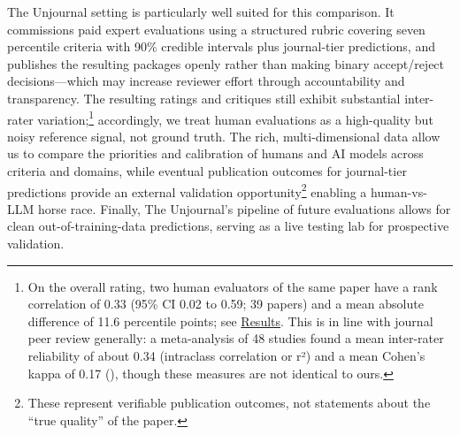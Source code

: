 \documentclass[
  11pt,
  letterpaper,
]{article}
\begin{document}
The Unjournal setting is particularly well suited for this comparison.
It commissions paid expert evaluations using a structured rubric
covering seven percentile criteria with 90\% credible intervals plus
journal-tier predictions, and publishes the resulting packages openly
rather than making binary accept/reject decisions---which may increase
reviewer effort through accountability and transparency. The resulting
ratings and critiques still exhibit substantial inter-rater
variation;\footnote{On the overall rating, two human evaluators of the
  same paper have a rank correlation of 0.33 (95\% CI 0.02 to 0.59; 39
  papers) and a mean absolute difference of 11.6 percentile points; see
  \hyperref[tbl-model-agreement-main]{Results}. This is in line with
  journal peer review generally: a meta-analysis of 48 studies found a
  mean inter-rater reliability of about 0.34 (intraclass correlation or
  r²) and a mean Cohen's kappa of 0.17
  (), though these measures are not identical to ours.} accordingly,
we treat human evaluations as a high-quality but noisy reference signal,
not ground truth. The rich, multi-dimensional data allow us to compare
the priorities and calibration of humans and AI models across criteria
and domains, while eventual publication outcomes for journal-tier
predictions provide an external validation opportunity\footnote{These
  represent verifiable publication outcomes, not statements about the
  ``true quality'' of the paper.} enabling a human-vs-LLM horse race.
Finally, The Unjournal's pipeline of future evaluations allows for clean
out-of-training-data predictions, serving as a live testing lab for
prospective validation.
\end{document}
